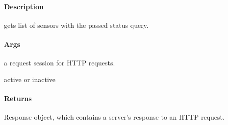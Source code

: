 \documentclass[letterpaper,10pt,english]{sphinxmanual}
\begin{document}
\begin{fulllineitems}
\label{\detokenize{gemini_perception_API:gemini_perception_API.get_sensor_by_status}}
\pysigstartsignatures
{}
\pysigstopsignatures

\paragraph{Description}
\label{\detokenize{gemini_perception_API:id20}}
\sphinxAtStartPar
gets list of sensors with the passed status query.


\paragraph{Args}
\label{\detokenize{gemini_perception_API:id21}}\begin{description}
\sphinxAtStartPar
a request session for HTTP requests.

\sphinxAtStartPar
active or inactive

\end{description}


\paragraph{Returns}
\label{\detokenize{gemini_perception_API:id22}}\begin{description}
\sphinxAtStartPar
Response object, which contains a server’s response to an HTTP request.

\end{description}

\end{fulllineitems}


\begin{fulllineitems}
\label{\detokenize{gemini_perception_API:gemini_perception_API.get_underlay_config}}
\pysigstartsignatures
{}
\pysigstopsignatures
\end{fulllineitems}
\end{document}
